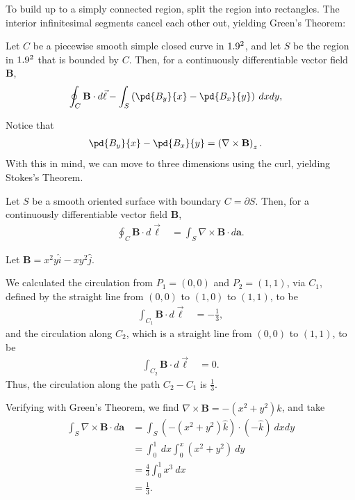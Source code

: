 \documentclass[10pt]{mypackage}
\begin{document}
To build up to a simply connected region, split the region into rectangles. The interior infinitesimal segments cancel each other out, yielding Green's Theorem:
\begin{theorem}
  Let $C$ be a piecewise smooth simple closed curve in $1.9^2$, and let $S$ be the region in $1.9^2$ that is bounded by $C$. Then, for a continuously differentiable vector field $\mathbf{B}$,
  \begin{align*}
    \oint_{C}^{} \mathbf{B}\cdot d\vec{\ell} &- \int_{S}^{} \left(\pd{B_y}{x} - \pd{B_x}{y}\right)\:dx dy,
  \end{align*}
\end{theorem}
Notice that
\begin{align*}
  \pd{B_y}{x} - \pd{B_x}{y} &= \left(\nabla \times \mathbf{B}\right)_{z}.
\end{align*}
With this in mind, we can move to three dimensions using the curl, yielding Stokes's Theorem.
\begin{theorem}
  Let $S$ be a smooth oriented surface with boundary $C = \partial S$. Then, for a continuously differentiable vector field $\mathbf{B}$,
  \begin{align*}
    \oint_{C}\mathbf{B}\cdot d\vec{\ell} &= \int_{S}^{} \nabla \times \mathbf{B}\cdot d\mathbf{a}.
  \end{align*}
\end{theorem}
\begin{example}
  Let $\mathbf{B} = x^2y \widehat{i} - xy^2\widehat{j}$.\newline

  We calculated the circulation from $P_1 = (0,0)$ and $P_2 = (1,1)$, via $C_1$, defined by the straight line from $(0,0)$ to $(1,0)$ to $(1,1)$, to be
  \begin{align*}
    \int_{C_1}^{} \mathbf{B}\cdot d\vec{\ell} &= -\frac{1}{3},
  \end{align*}
  and the circulation along $C_2$, which is a straight line from $(0,0)$ to $(1,1)$, to be
  \begin{align*}
    \int_{C_2}^{} \mathbf{B}\cdot d\vec{\ell} &= 0.
  \end{align*}
  Thus, the circulation along the path $C_2 - C_1$ is $\frac{1}{3}$.\newline

  Verifying with Green's Theorem, we find $\nabla \times \mathbf{B} = -\left(x^2 + y^2\right)\widehat{k}$, and take
  \begin{align*}
    \int_{S}^{} \nabla \times \mathbf{B}\cdot d\mathbf{a} &= \int_{S}^{} \left(-\left(x^2 + y^2\right)\widehat{k}\right)\cdot \left(-\widehat{k}\right)\:dxdy\\
                                                          &= \int_{0}^{1} \:dx\int_{0}^{x} \left(x^2 + y^2\right)\:dy\\
                                                          &= \frac{4}{3}\int_{0}^{1} x^3\:dx\\
                                                          &= \frac{1}{3}.
  \end{align*}
\end{example}
\end{document}
